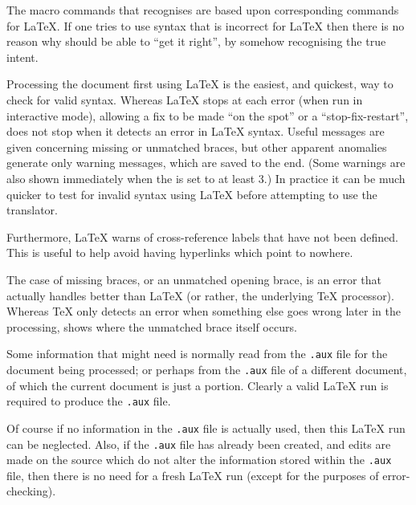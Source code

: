\begin{htmllist}
%
\item[\LaTeX{} macros: ]
The macro commands that \latextohtml{} recognises are based upon
corresponding commands for \LaTeX. If one tries to use syntax that is
incorrect for \LaTeX{} then there is no reason why \latextohtml{} should
be able to ``get it right'', by somehow recognising the true intent.


%
\item[error checking: ]
Processing the document first using \LaTeX{} is the easiest,
and quickest, way to check for valid syntax.\html{\\}
Whereas \LaTeX{} stops at each error (when run in interactive mode),
allowing a fix to be made ``on the spot'' or a ``stop-fix-restart'',
\latextohtml{} does not stop when it detects an error in \LaTeX{} syntax.
Useful messages are given concerning missing or unmatched braces,
but other apparent anomalies generate only warning messages,
which are saved to the end.
(Some warnings are also shown immediately when the 
 is set to at least 3.)\html{\\}
In practice it can be much quicker to test for invalid syntax using \LaTeX{} before
attempting to use the \latextohtml{} translator.

Furthermore, \LaTeX{} warns of cross-reference labels that have not been defined.
This is useful to help avoid having hyperlinks which point to nowhere.

%
\html{\\}\noindent
The case of missing braces, or an unmatched opening brace,
is an error that \latextohtml{} actually handles better than \LaTeX{}
(or rather, the underlying \TeX{} processor).
Whereas \TeX{} only detects an error when something else goes wrong
later in the processing, \latextohtml{} shows where the
unmatched brace itself occurs.


\item[auxiliary file: ]
Some information that \latextohtml{} might need is normally
read from the \texttt{.aux} file for the document being processed;
or perhaps from the \texttt{.aux} file of a different document,
of which the current document is just a portion.
Clearly a valid \LaTeX{} run is required to produce the \texttt{.aux} file.

\html{\\}\noindent
Of course if no information in the \texttt{.aux} file is actually used,
then this \LaTeX{} run can be neglected.
Also, if the \texttt{.aux} file has already been created, and edits
are made on the source which do not alter the information stored
within the \texttt{.aux} file, then there is no need for a fresh
\LaTeX{} run (except for the purposes of error-checking).



\end{htmllist}
